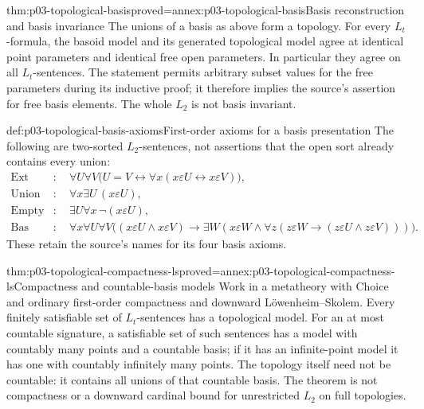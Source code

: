 \begin{hbtheorem}{thm:p03-topological-basis}{proved=annex:p03-topological-basis}{Basis reconstruction and basis invariance}
The unions of a basis as above form a topology. For every \(L_t\)-formula,
the basoid model and its generated topological model agree at identical
point parameters and identical free open parameters. In particular they
agree on all \(L_t\)-sentences. The statement permits arbitrary subset
values for the free parameters during its inductive proof; it therefore
implies the source's assertion for free basis elements.
The whole \(L_2\) is not basis invariant.
\end{hbtheorem}

\begin{hbdefinition}{def:p03-topological-basis-axioms}{First-order axioms for a basis presentation}
The following are two-sorted \(L_2\)-sentences, not assertions that the
open sort already contains every union:
\[
\begin{aligned}
 \mathrm{Ext}&:\quad
 \forall U\forall V\bigl(U=V\leftrightarrow
                  \forall x(x\varepsilon U\leftrightarrow x\varepsilon V)\bigr),\\
 \mathrm{Union}&:\quad\forall x\exists U\,(x\varepsilon U),\\
 \mathrm{Empty}&:\quad\exists U\forall x\,\neg(x\varepsilon U),\\
 \mathrm{Bas}&:\quad
 \forall x\forall U\forall V\bigl((x\varepsilon U\land x\varepsilon V)
       \to\exists W(x\varepsilon W\land
         \forall z(z\varepsilon W\to(z\varepsilon U\land z\varepsilon V)))\bigr).
\end{aligned}
\]
These retain the source's names for its four basis axioms.
\end{hbdefinition}

\begin{hbtheorem}{thm:p03-topological-compactness-ls}{proved=annex:p03-topological-compactness-ls}{Compactness and countable-basis models}
Work in a metatheory with Choice and ordinary first-order compactness and
downward L\"owenheim--Skolem. Every finitely satisfiable set of
\(L_t\)-sentences has a topological model. For an at most countable
signature, a satisfiable set of such sentences has a model with countably
many points and a countable basis; if it has an infinite-point model it
has one with countably infinitely many points.
The topology itself need not be countable: it contains all unions of that
countable basis. The theorem is not compactness or a downward cardinal
bound for unrestricted \(L_2\) on full topologies.
\end{hbtheorem}

